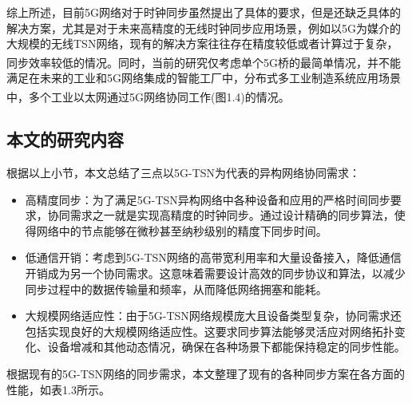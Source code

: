 \documentclass[UTF8,a4paper,12pt]{ctexart}
\numberwithin{equation}{section}
\begin{document}
	综上所述，目前5G网络对于时钟同步虽然提出了具体的要求，但是还缺乏具体的解决方案，尤其是对于未来高精度的无线时钟同步应用场景，例如以5G为媒介的大规模的无线TSN网络，现有的解决方案往往存在精度较低或者计算过于复杂，同步效率较低的情况。同时，当前的研究仅考虑单个5G桥的最简单情况\textsuperscript{\cite{9557468}}，并不能满足在未来的工业和5G网络集成的智能工厂中，分布式多工业制造系统应用场景中，多个工业以太网通过5G网络协同工作(图1.4)的情况\textsuperscript{\cite{8402373}}。
	\begin{figure}[htb] 
	\end{figure}
	
	\subsection{本文的研究内容}
	根据以上小节，本文总结了三点以5G-TSN为代表的异构网络协同需求：
	\begin{itemize}
		\item  高精度同步：为了满足5G-TSN异构网络中各种设备和应用的严格时间同步要求，协同需求之一就是实现高精度的时钟同步。通过设计精确的同步算法，使得网络中的节点能够在微秒甚至纳秒级别的精度下同步时间。
		\item 低通信开销：考虑到5G-TSN网络的高带宽利用率和大量设备接入，降低通信开销成为另一个协同需求。这意味着需要设计高效的同步协议和算法，以减少同步过程中的数据传输量和频率，从而降低网络拥塞和能耗。
		\item 大规模网络适应性：由于5G-TSN网络规模庞大且设备类型复杂，协同需求还包括实现良好的大规模网络适应性。这要求同步算法能够灵活应对网络拓扑变化、设备增减和其他动态情况，确保在各种场景下都能保持稳定的同步性能。
	\end{itemize}
	根据现有的5G-TSN网络的同步需求，本文整理了现有的各种同步方案在各方面的性能，如表1.3所示。
	
\end{document}
